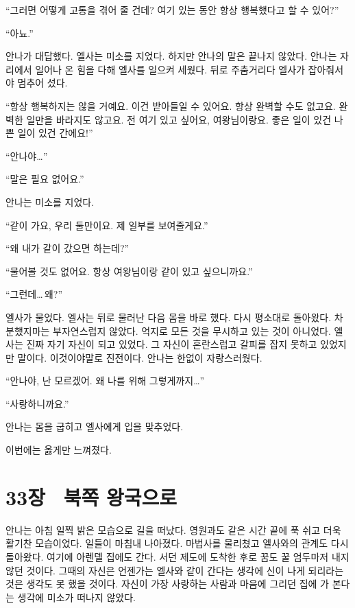 ``그러면 어떻게 고통을 겪어 줄 건데? 여기 있는 동안 항상 행복했다고 할 수 있어?''

``아뇨.''

안나가 대답했다. 엘사는 미소를 지었다. 하지만 안나의 말은 끝나지 않았다. 안나는 자리에서 일어나 온 힘을 다해 엘사를 일으켜 세웠다. 뒤로 주춤거리다 엘사가 잡아줘서야 멈추어 섰다.

``항상 행복하지는 않을 거예요. 이건 받아들일 수 있어요. 항상 완벽할 수도 없고요. 완벽한 일만을 바라지도 않고요. 전 여기 있고 싶어요, 여왕님이랑요. 좋은 일이 있건 나쁜 일이 있건 간에요!''

``안나야\ldots''

``말은 필요 없어요.''

안나는 미소를 지었다.

``같이 가요, 우리 둘만이요. 제 일부를 보여줄게요.''

``왜 내가 같이 갔으면 하는데?''

``물어볼 것도 없어요. 항상 여왕님이랑 같이 있고 싶으니까요.''

``그런데\ldots\,왜?''

엘사가 물었다. 엘사는 뒤로 물러난 다음 몸을 바로 했다. 다시 평소대로 돌아왔다. 차분했지마는 부자연스럽지 않았다. 억지로 모든 것을 무시하고 있는 것이 아니었다. 엘사는 진짜 자기 자신이 되고 있었다. 그 자신이 혼란스럽고 갈피를 잡지 못하고 있었지만 말이다. 이것이야말로 진전이다. 안나는 한없이 자랑스러웠다.

``안나야, 난 모르겠어. 왜 나를 위해 그렇게까지\ldots''

``사랑하니까요.''

안나는 몸을 굽히고 엘사에게 입을 맞추었다.

이번에는 옳게만 느껴졌다.



\chapter[33장  북쪽 왕국으로][33장\hspace*{.5em}북쪽 왕국으로]{33장 \ 북쪽 왕국으로}



안나는 아침 일찍 밝은 모습으로 길을 떠났다. 영원과도 같은 시간 끝에 푹 쉬고 더욱 활기찬 모습이었다. 일들이 마침내 나아졌다. 마법사를 물리쳤고 엘사와의 관계도 다시 돌아왔다. 여기에 아렌델 집에도 간다. 서던 제도에 도착한 후로 꿈도 꿀 엄두마저 내지 않던 것이다. 그때의 자신은 언젠가는 엘사와 같이 간다는 생각에 신이 나게 되리라는 것은 생각도 못 했을 것이다. 자신이 가장 사랑하는 사람과 마음에 그리던 집에 가 본다는 생각에 미소가 떠나지 않았다.

